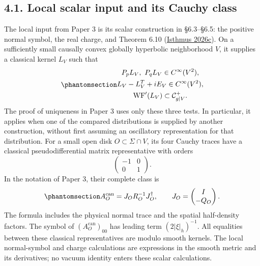 \documentclass[
  english,
  11pt,
  reqno]{amsart}
\begin{document}
\protect{}\label{sec:p4-local-wave-input}

\subsection{4.1. Local scalar input and its Cauchy
class}\label{local-scalar-input-and-its-cauchy-class}

The local input from Paper 3 is its scalar construction in §6.3--§6.5:
the positive normal symbol, the real charge, and Theorem 6.10
(\hyperref[ref-IsthmusSmooth2026]{Isthmus 2026c}). On a sufficiently
small causally convex globally hyperbolic neighborhood \(V\), it
supplies a classical kernel \(L_V\) such that
\begin{equation}\protect\phantomsection\label{eq:p4-local-wave-input}{\begin{gathered}
P_pL_V,\ P_qL_V\in C^\infty(V^2), \\
L_V-L_V^T+iE_V\in C^\infty(V^2), \\
\operatorname{WF}'(L_V)\subset\mathcal C_{g|V}^+.
\end{gathered}}\end{equation} The proof of uniqueness in Paper 3 uses only these three
tests. In particular, it applies when one of the compared distributions
is supplied by another construction, without first assuming an
oscillatory representation for that distribution. For a small open disk
\(O\subset\Sigma\cap V\), its four Cauchy traces have a classical
pseudodifferential matrix representative with orders \[
\begin{pmatrix}-1&0\\0&1\end{pmatrix}.
\] In the notation of Paper 3, their complete class is
\begin{equation}\protect\phantomsection\label{eq:p4-canonical-local-cauchy-matrix}{
A_O^{\mathrm{can}}=J_OR_O^{-1}J_O^\dagger,
\qquad
J_O=\begin{pmatrix}I\\-Q_O\end{pmatrix}.
}\end{equation} The formula includes the physical normal trace and the
spatial half-density factors. The symbol of
\((A_O^{\mathrm{can}})_{00}\) has leading term \((2|\xi|_h)^{-1}\). All
equalities between these classical representatives are modulo smooth
kernels. The local normal-symbol and charge calculations are expressions
in the smooth metric and its derivatives; no vacuum identity enters
these scalar calculations.
\end{document}

